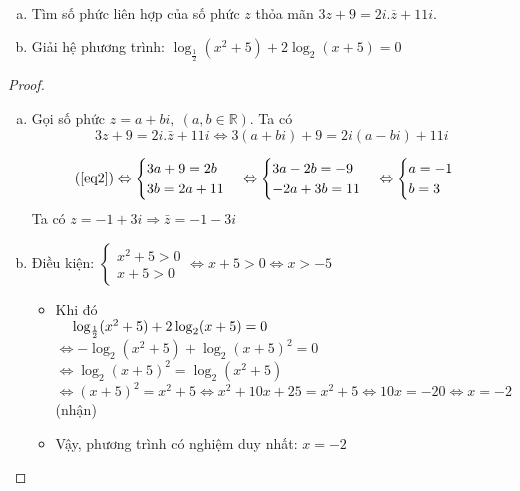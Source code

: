 \begin{dl}~
	\begin{enumerate}[a)]
		\item Tìm số phức liên hợp của số phức $z$ thỏa mãn $3z+9=2i.\overline{z}+11i$.
		\item Giải hệ phương trình: $\log_{\frac{1}{2}} (x^2+5)+2\log_2(x+5)=0$
	\end{enumerate}
\end{dl}
\begin{proof}~
	\begin{enumerate}[a)]
		\item Gọi số phức 
		$z=a+bi,~(a,b\in\mathbb{R})$. Ta có
		\begin{equation}\label{eq2}
		3z+9=2i.\bar{z}+11i\Leftrightarrow 3(a+bi)+9=2i(a-bi)+11i
		\end{equation}
	
	
		$$
		(\ref{eq2})\Leftrightarrow \begin{cases}
		3a+9=2b\\
		3b=2a+11
		\end{cases}\Leftrightarrow 
		\begin{cases}
		3a-2b=-9\\
		-2a+3b=11
		\end{cases}\Leftrightarrow\begin{cases}
		a=-1\\
		b=3
		\end{cases}
		$$
		Ta có $z=-1+3i\Rightarrow \bar{z}=-1-3i$
		\item  Điều kiện: $\begin{cases}
		x^2+5>0\\
		x+5>0
		\end{cases}\Leftrightarrow x+5>0\Leftrightarrow x>-5$\\
		\begin{itemize}
			\item  Khi đó\\[4pt]
		$\mbox{\quad}\log_{\frac{1}{2}} (x^2+5)+2\log_2(x+5)=0$\\[4pt]
		$\Leftrightarrow-\log_{2} (x^2+5)+\log_2(x+5)^2=0$\\[4pt]
		$\Leftrightarrow\log_2(x+5)^2=\log_{2} (x^2+5)$\\[-6pt]
	
	$\Leftrightarrow (x+5)^2=x^2+5\Leftrightarrow x^2+10x+25=x^2+5\Leftrightarrow 10x=-20\Leftrightarrow x=-2$ (nhận)
		\item Vậy, phương trình có nghiệm duy nhất: $x=-2$
		\end{itemize}
	\end{enumerate}
\end{proof}

